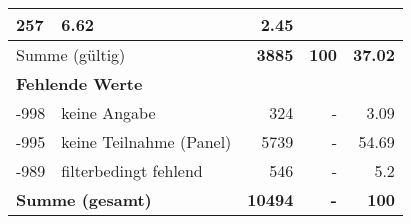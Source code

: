 \begin{longtable}{lXrrr}
       \num{257} &
       \num[round-mode=places,round-precision=2]{6.62} &
         \num[round-mode=places,round-precision=2]{2.45} \\
     \midrule
     \multicolumn{2}{l}{Summe (gültig)} &
       \textbf{\num{3885}} &
     \textbf{\num{100}} &
       \textbf{\num[round-mode=places,round-precision=2]{37.02}} \\
     \multicolumn{5}{l}{\textbf{Fehlende Werte}}\\
       -998 &
       keine Angabe &
         \num{324} &
        - &
         \num[round-mode=places,round-precision=2]{3.09} \\
       -995 &
       keine Teilnahme (Panel) &
         \num{5739} &
        - &
         \num[round-mode=places,round-precision=2]{54.69} \\
       -989 &
       filterbedingt fehlend &
         \num{546} &
        - &
         \num[round-mode=places,round-precision=2]{5.2} \\
     \midrule
     \multicolumn{2}{l}{\textbf{Summe (gesamt)}} &
          \textbf{\num{10494}} &
        \textbf{-} &
        \textbf{\num{100}} \\
     \bottomrule
     \end{longtable}
     
